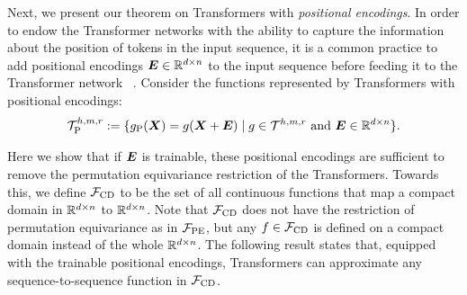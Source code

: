 
Next, we present our theorem on Transformers with \emph{positional encodings}. In order to endow the Transformer networks with the ability to capture the information about the position of tokens in the input sequence, it is a common practice to add positional encodings ${\bm{E}} \in \mathbb{R}^{d \times n}$ to the input sequence before feeding it to the Transformer network~ \citep{vaswani2017attention, devlin2018bert}. Consider the functions represented by Transformers with positional encodings: 
\begin{equation*}
    \mathcal{T}^{h, m, r}_{\rm P} := \{ g_{\rm P}({\bm{X}}) = g({\bm{X}}+{\bm{E}}) \mid g \in \mathcal{T}^{h, m, r} \text{ and } {\bm{E}} \in \mathbb{R}^{d \times n} \}.
\end{equation*}

Here we show that if ${\bm{E}}$ is trainable, these positional encodings are sufficient to remove the permutation equivariance restriction of the Transformers. Towards this, we define $\mathcal{F}_{\rm CD}$ to be the set of all continuous functions that map a compact domain in $\mathbb{R}^{d \times n}$ to $\mathbb{R}^{d\times n}$. Note that $\mathcal{F}_{\rm CD}$ does not have the restriction of permutation equivariance as in $\mathcal{F}_{\rm PE}$, but any $f \in \mathcal{F}_{\rm CD}$ is defined on a compact domain instead of the whole $\mathbb{R}^{d \times n}$. The following result states that, equipped with the trainable positional encodings, Transformers can approximate any sequence-to-sequence function in $\mathcal{F}_{\rm CD}$. 
 
